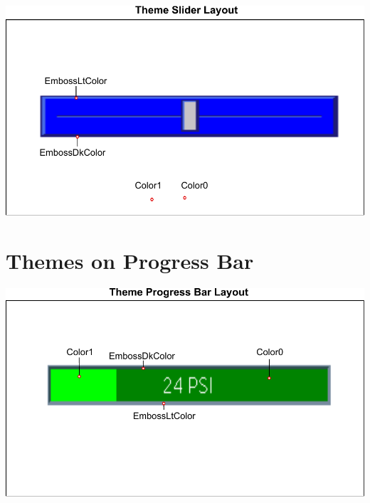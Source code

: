 \begin{DoxyImageNoCaption}
  \mbox{\includegraphics{themeSlider}}
\end{DoxyImageNoCaption}
 \hypertarget{df/df8/intro_themes_themeProgress}{}\section{Themes on Progress Bar}\label{df/df8/intro_themes_themeProgress}
 
\begin{DoxyImageNoCaption}
  \mbox{\includegraphics{themeProgress}}
\end{DoxyImageNoCaption}
 